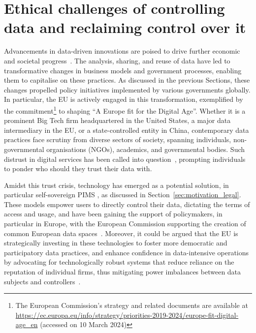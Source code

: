 \section{Ethical challenges of controlling data and reclaiming control over it}
\label{sec:ethical_challenges}

Advancements in data-driven innovations are poised to drive further economic and societal progress~\citep{jacobides_platforms_2019}.
The analysis, sharing, and reuse of data have led to transformative changes in business models and government processes, enabling them to capitalise on these practices. 
As discussed in the previous Sections, these changes propelled policy initiatives implemented by various governments globally.
In particular, the EU is actively engaged in this transformation, exemplified by the \cite{european_commission_communication_2020} commitment\footnote{The European Commission's strategy and related documents are available at \url{https://ec.europa.eu/info/strategy/priorities-2019-2024/europe-fit-digital-age_en} (accessed on 10 March 2024)} to shaping ``A Europe fit for the Digital Age''. 
Whether it is a prominent Big Tech firm headquartered in the United States, a major data intermediary in the EU, or a state-controlled entity in China, contemporary data practices face scrutiny from diverse sectors of society, spanning individuals, non-governmental organisations (NGOs), academics, and governmental bodies.
Such distrust in digital services has been called into question~\citep{waldman_industry_2021}, prompting individuals to ponder who should they trust their data with.

Amidst this trust crisis, technology has emerged as a potential solution, in particular self-sovereign PIMS \citep{chomczyk_penedo_selfsovereign_2021}, as discussed in Section~\ref{sec:motivation_legal}.
These models empower users to directly control their data, dictating the terms of access and usage, and have been gaining the support of policymakers, in particular in Europe, with the European Commission supporting the creation of common European data spaces~\citeyearpar{noauthor_commission_2022}.
Moreover, it could be argued that the EU is strategically investing in these technologies to foster more democratic and participatory data practices, and enhance confidence in data-intensive operations by advocating for technologically robust systems that reduce reliance on the reputation of individual firms, thus mitigating power imbalances between data subjects and controllers~\citep{european_commission_communication_2020}.


